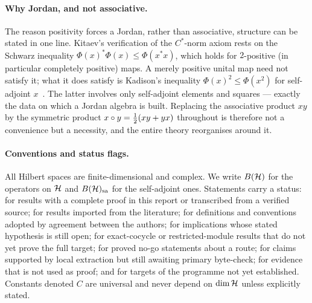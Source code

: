 \paragraph{Why Jordan, and not associative.}
The reason positivity forces a Jordan, rather than associative, structure can be
stated in one line. Kitaev's verification of the $C^*$-norm axiom rests on the
Schwarz inequality $\Phi(x)^*\Phi(x)\le\Phi(x^*x)$, which holds for $2$-positive
(in particular completely positive) maps. A merely positive unital map need not
satisfy it; what it does satisfy is Kadison's inequality
$\Phi(x)^2\le\Phi(x^2)$ for self-adjoint $x$~\cite{Kadison1952}. The latter
involves only self-adjoint elements and squares --- exactly the data on which a
Jordan algebra is built. Replacing the associative product $xy$ by the symmetric
product $x\circ y=\tfrac12(xy+yx)$ throughout is therefore not a convenience but a
necessity, and the entire theory reorganises around it.

\paragraph{Conventions and status flags.}
All Hilbert spaces are finite-dimensional and complex. We write $B(\mathcal{H})$ for the
operators on $\mathcal{H}$ and $B(\mathcal{H})_{\mathrm{sa}}$ for the self-adjoint ones. Statements carry a
status:  for results with a complete proof in this report or
transcribed from a verified source;  for results imported from
the literature;  for definitions and conventions adopted by
agreement between the authors;  for implications whose
stated hypothesis is still open;  for exact-cocycle or
restricted-module results that do not yet prove the full target;
 for proved no-go statements about a route;
 for claims supported by local extraction but still
awaiting primary byte-check;  for evidence that is not used
as proof; and
 for targets of the programme not yet established. Constants
denoted $C$ are universal and never depend on $\dim\mathcal{H}$ unless explicitly
stated.

